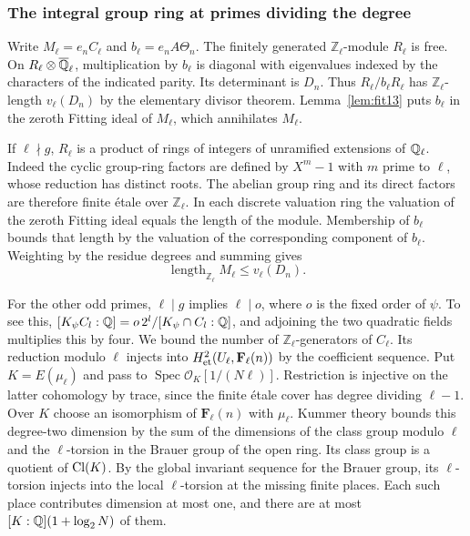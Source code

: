 \documentclass[a4paper,11pt]{article}
\theoremstyle{definition}
\theoremstyle{remark}
\newcommand{\ZZ}{\mathbb Z}\newcommand{\ord}{\operatorname{ord}}
\newcommand{\len}{\operatorname{length}}\newcommand{\Res}{\operatorname*{Res}}
\numberwithin{equation}{section}
\begin{document}
\subsubsection{The integral group ring at primes dividing the degree}\label{nav:II-03}
Write \(M_\ell=e_n C_\ell\) and \(b_\ell=e_nA\Theta_n\). The finitely generated \(\ZZ_\ell\)-module \(R_\ell\) is free. On \(R_\ell\otimes\overline{\mathbb Q}_\ell\), multiplication by \(b_\ell\) is diagonal with eigenvalues indexed by the characters of the indicated parity. Its determinant is \(D_n\). Thus \(R_\ell/b_\ell R_\ell\) has \(\ZZ_\ell\)-length \(v_\ell(D_n)\) by the elementary divisor theorem. Lemma~\ref{lem:fit13} puts \(b_\ell\) in the zeroth Fitting ideal of \(M_\ell\), which annihilates \(M_\ell\).

If \(\ell\nmid g\), \(R_\ell\) is a product of rings of integers of unramified extensions of \(\mathbb Q_\ell\). Indeed the cyclic group-ring factors are defined by \(X^m-1\) with \(m\) prime to \(\ell\), whose reduction has distinct roots. The abelian group ring and its direct factors are therefore finite étale over \(\ZZ_\ell\). In each discrete valuation ring the valuation of the zeroth Fitting ideal equals the length of the module. Membership of \(b_\ell\) bounds that length by the valuation of the corresponding component of \(b_\ell\). Weighting by the residue degrees and summing gives
\[
                           \len_{\ZZ_\ell}M_\ell\le v_\ell(D_n).
\]

For the other odd primes, \(\ell\mid g\) implies \(\ell\mid o\), where \(o\) is the fixed order of \(\psi\). To see this, \([K_\psi C_l:\mathbb Q]=o\,2^l/[K_\psi\cap C_l:\mathbb Q]\), and adjoining the two quadratic fields multiplies this by four. We bound the number of \(\ZZ_\ell\)-generators of \(C_\ell\). Its reduction modulo \(\ell\) injects into \(H^2_{\rm et}(U_\ell,\mathbf F_\ell(n))\) by the coefficient sequence. Put \(K=E(\mu_\ell)\) and pass to \(\operatorname{Spec}\mathcal O_K[1/(N\ell)]\). Restriction is injective on the latter cohomology by trace, since the finite étale cover has degree dividing \(\ell-1\). Over \(K\) choose an isomorphism of \(\mathbf F_\ell(n)\) with \(\mu_\ell\). Kummer theory bounds this degree-two dimension by the sum of the dimensions of the class group modulo \(\ell\) and the \(\ell\)-torsion in the Brauer group of the open ring. Its class group is a quotient of \({\rm Cl}(K)\). By the global invariant sequence for the Brauer group, its \(\ell\)-torsion injects into the local \(\ell\)-torsion at the missing finite places. Each such place contributes dimension at most one, and there are at most \([K:\mathbb Q](1+\log_2 N)\) of them.~\cite{II-II-II-duality13,II-II-II-milne}
\end{document}
